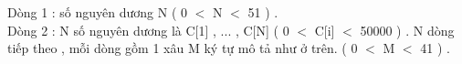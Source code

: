 Dòng 1 : số nguyên dương N ( 0 $<$ N $<$ 51 ) .   
\\   Dòng 2 : N số nguyên dương là C[1] , ... , C[N] ( 0 $<$ C[i] $<$ 50000 ) . N dòng tiếp theo , mỗi dòng gồm 1 xâu M ký tự mô tả như ở trên. ( 0 $<$ M $<$ 41 ) .